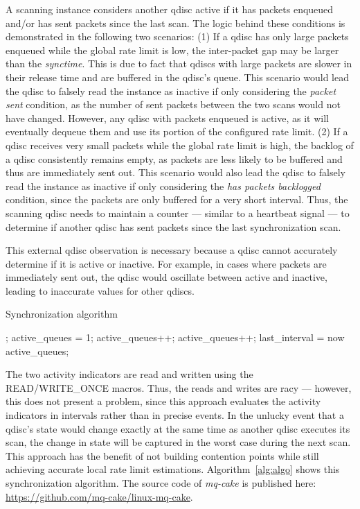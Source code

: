 A scanning instance considers another qdisc active if it has packets enqueued and/or has sent packets since the last scan.
%
The logic behind these conditions is demonstrated in the following two scenarios:
%
(1) If a qdisc has only large packets enqueued while the global rate limit is low, the inter-packet gap may be larger than the \textit{synctime}.
This is due to fact that qdiscs with large packets are slower in their release time and are buffered in the qdisc's queue.
%
This scenario would lead the qdisc to falsely read the instance as inactive if only considering the \textit{packet sent} condition, as the number of sent packets between the two scans  would not have changed.
%
However, any qdisc with packets enqueued is active, as it will eventually dequeue them and use its portion of the configured rate limit.
%
(2) If a qdisc receives very small packets while the global rate limit is high, the backlog of a qdisc consistently remains empty, as packets are less likely to be buffered and thus are immediately sent out.
%
This scenario would also lead the qdisc to falsely read the instance as inactive if only considering the \textit{has packets backlogged} condition, since the packets are only buffered for a very short interval.
%
Thus, the scanning qdisc needs to maintain a counter --- similar to a heartbeat signal --- to determine if another qdisc has sent packets since the last synchronization scan.
%

This external qdisc observation is necessary because a qdisc cannot accurately determine if it is active or inactive.
%
For example, in cases where packets are immediately sent out, the qdisc would oscillate between active and inactive, leading to inaccurate values for other qdiscs. 
%

\begin{algorithm}[t]
    \caption{Synchronization algorithm}\label{alg:algo}
\begin{algorithmic}[1]
    \State {};
\EndIf
\State active\_queues = 1;
    \State active\_queues++;
    \State active\_queues++;
    \EndIf
\EndFor
\State last\_interval = now
\State \Return active\_queues;
\EndProcedure
\end{algorithmic}
\end{algorithm}
The two activity indicators are read and written using the READ/WRITE\_ONCE macros.
%
Thus, the reads and writes are racy --- however, this does not present a problem, since this approach evaluates the activity indicators in intervals rather than in precise events.
%
In the unlucky event that a qdisc's state would change exactly at the same time as another qdisc executes its scan, the change in state will be captured in the worst case during the next scan.
%
This approach has the benefit of not building contention points while still achieving accurate local rate limit estimations.
%
Algorithm~\ref{alg:algo} shows this synchronization algorithm.
%
The source code of \textit{mq-cake} is published here: \url{https://github.com/mq-cake/linux-mq-cake}.

